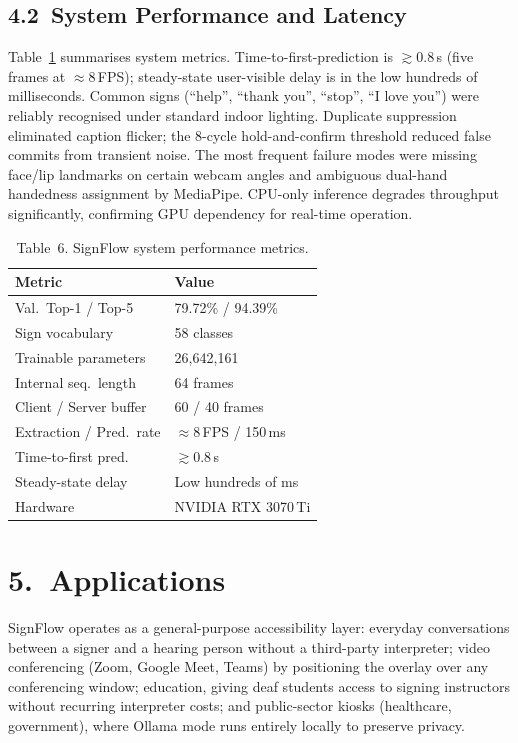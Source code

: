 \documentclass[10pt, twocolumn]{article}
\begin{document}
\subsection*{4.2~System Performance and Latency}
Table~\ref{tab:perf} summarises system metrics. Time-to-first-prediction is $\gtrsim 0.8$\,s (five frames at $\approx$8\,FPS); steady-state user-visible delay is in the low hundreds of milliseconds. Common signs (``help'', ``thank you'', ``stop'', ``I love you'') were reliably recognised under standard indoor lighting. Duplicate suppression eliminated caption flicker; the 8-cycle hold-and-confirm threshold reduced false commits from transient noise. The most frequent failure modes were missing face/lip landmarks on certain webcam angles and ambiguous dual-hand handedness assignment by MediaPipe. CPU-only inference degrades throughput significantly, confirming GPU dependency for real-time operation.

\begin{table}[h]
\centering
\caption{Table~6. SignFlow system performance metrics.}
\label{tab:perf}
\small
\begin{tabular}{|p{2.8cm}|p{2.6cm}|}
\hline
\textbf{Metric} & \textbf{Value} \\
\hline
Val.\ Top-1 / Top-5 & 79.72\% / 94.39\% \\
\hline
Sign vocabulary & 58 classes \\
\hline
Trainable parameters & 26,642,161 \\
\hline
Internal seq.\ length & 64 frames \\
\hline
Client / Server buffer & 60 / 40 frames \\
\hline
Extraction / Pred.\ rate & $\approx$8\,FPS / 150\,ms \\
\hline
Time-to-first pred. & $\gtrsim 0.8$\,s \\
\hline
Steady-state delay & Low hundreds of ms \\
\hline
Hardware & NVIDIA RTX 3070\,Ti \\
\hline
\end{tabular}
\end{table}

\section*{5.~Applications}
SignFlow operates as a general-purpose accessibility layer: everyday conversations between a signer and a hearing person without a third-party interpreter; video conferencing (Zoom, Google Meet, Teams) by positioning the overlay over any conferencing window; education, giving deaf students access to signing instructors without recurring interpreter costs; and public-sector kiosks (healthcare, government), where Ollama mode runs entirely locally to preserve privacy.
\end{document}
